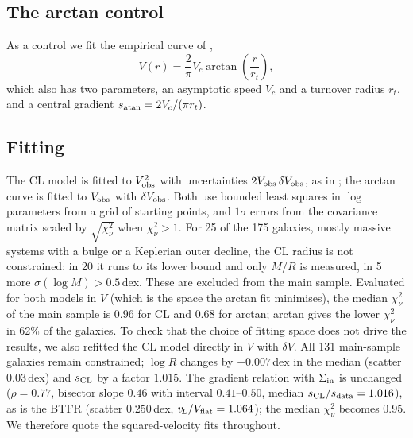 \documentclass[11pt,a4paper]{article}
\newcommand{\vL}{v_{\!L}}
\newcommand{\sCL}{s_{\rm CL}}
\newcommand{\sat}{s_{\rm atan}}
\newcommand{\sdat}{s_{\rm data}}
\newcommand{\Sin}{\Sigma_{\rm in}}
\newcommand{\Vf}{V_{\rm flat}}
\begin{document}
\subsection{The arctan control}
As a control we fit the empirical curve of \citet{Courteau1997},
\begin{equation}
V(r)=\frac{2}{\pi}V_c\arctan\!\left(\frac{r}{r_t}\right),
\label{eq:atan}
\end{equation}
which also has two parameters, an asymptotic speed $V_c$ and a turnover radius $r_t$, and a central gradient $\sat=2V_c/(\pi r_t)$.

\subsection{Fitting}
\label{sec:fits}
The CL model is fitted to $V_{\rm obs}^2$ with uncertainties $2V_{\rm obs}\,\delta V_{\rm obs}$, as in \citet{deHaas2018}; the arctan curve is fitted to $V_{\rm obs}$ with $\delta V_{\rm obs}$. Both use bounded least squares in $\log$ parameters from a grid of starting points, and $1\sigma$ errors from the covariance matrix scaled by $\sqrt{\chi^2_\nu}$ when $\chi^2_\nu>1$. For 25 of the 175 galaxies, mostly massive systems with a bulge or a Keplerian outer decline, the CL radius is not constrained: in 20 it runs to its lower bound and only $M/R$ is measured, in 5 more $\sigma(\log M)>0.5$\,dex. These are excluded from the main sample. Evaluated for both models in $V$ (which is the space the arctan fit minimises), the median $\chi^2_\nu$ of the main sample is $0.96$ for CL and $0.68$ for arctan; arctan gives the lower $\chi^2_\nu$ in 62\% of the galaxies. To check that the choice of fitting space does not drive the results, we also refitted the CL model directly in $V$ with $\delta V$. All 131 main-sample galaxies remain constrained; $\log R$ changes by $-0.007$\,dex in the median (scatter $0.03$\,dex) and $\sCL$ by a factor $1.015$. The gradient relation with $\Sin$ is unchanged ($\rho=0.77$, bisector slope $0.46$ with interval $0.41$--$0.50$, median $\sCL/\sdat=1.016$), as is the BTFR (scatter $0.250$\,dex, $\vL/\Vf=1.064$); the median $\chi^2_\nu$ becomes $0.95$. We therefore quote the squared-velocity fits throughout.
\end{document}
